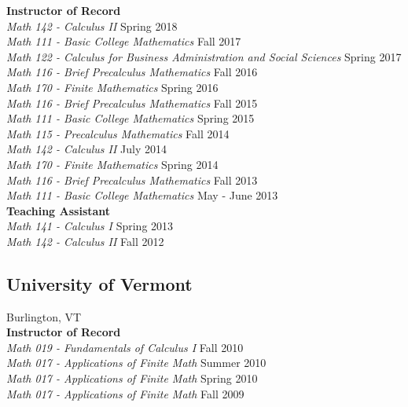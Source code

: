 \documentclass{article}
\begin{document}
\noindent\textbf{Instructor of Record}\\
\textsl{Math 142 - Calculus II} \hfill Spring 2018\\
\textsl{Math 111 - Basic College Mathematics} \hfill Fall 2017\\
\textsl{Math 122 - Calculus for Business Administration and Social Sciences} \hfill Spring 2017\\
\textsl{Math 116 - Brief Precalculus Mathematics} \hfill Fall 2016\\
\textsl{Math 170 - Finite Mathematics} \hfill Spring 2016\\
\textsl{Math 116 - Brief Precalculus Mathematics} \hfill Fall 2015\\
\textsl{Math 111 - Basic College Mathematics} \hfill Spring 2015\\
\textsl{Math 115 - Precalculus Mathematics} \hfill Fall 2014\\
\textsl{Math 142 - Calculus II} \hfill July 2014\\
\textsl{Math 170 - Finite Mathematics} \hfill Spring 2014\\
\textsl{Math 116 - Brief Precalculus Mathematics} \hfill Fall 2013\\
\textsl{Math 111 - Basic College Mathematics} \hfill May - June 2013\\

\noindent\textbf{Teaching Assistant}\\
\textsl{Math 141 - Calculus I} \hfill Spring 2013\\
\textsl{Math 142 - Calculus II} \hfill Fall 2012

\subsection*{University of Vermont}
\noindent Burlington, VT\\

\noindent\textbf{Instructor of Record}\\
\textsl{Math 019 - Fundamentals of Calculus I} \hfill Fall 2010\\
\textsl{Math 017 - Applications of Finite Math} \hfill Summer 2010\\
\textsl{Math 017 - Applications of Finite Math} \hfill Spring 2010\\
\textsl{Math 017 - Applications of Finite Math} \hfill Fall 2009\\

\end{document}
